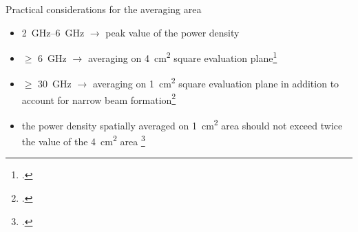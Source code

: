 \documentclass[xcolor=dvipsnames,10pt]{beamer}
\begin{document}
\begin{frame}{Practical considerations for the averaging area}
    \begin{itemize}
        \item \SIrange{2}{6}{\GHz} $\rightarrow$ peak value of the power density
        \item $\geq$ \SI{6}{\GHz} $\rightarrow$ averaging on \SI{4}{\cm\squared} square evaluation plane\footcite{Hashimoto2017On,Funahashi2018Averaging}
        \item $\geq$ \SI{30}{\GHz} $\rightarrow$ averaging on \SI{1}{\cm\squared} square evaluation plane in addition to account for narrow beam formation\footcite{Foster2016Thermal}
        \item the power density spatially averaged on \SI{1}{\cm\squared} area should not exceed twice the value of the \SI{4}{\cm\squared} area \footcite{ICNIRP2020Guidelines}
    \end{itemize}
\end{frame}
\end{document}
